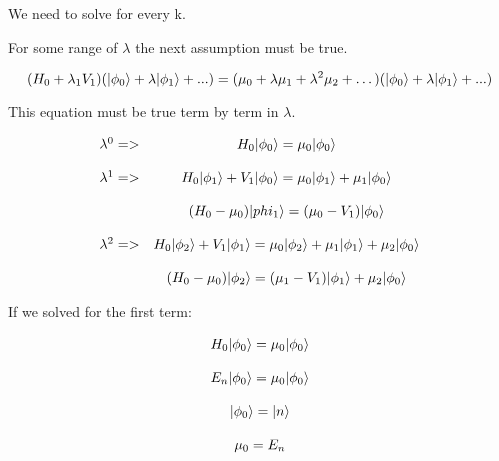 We need to solve for every k.

For some range of $\lambda$ the next assumption must be true.

\begin{equation}
  (H_0 + \lambda_1V_1) (\lvert\phi_0\rangle+\lambda\lvert\phi_1\rangle+...) = (\mu_0 + \lambda\mu_1 + \lambda^2\mu_2 + \dots)(\lvert\phi_0\rangle+\lambda\lvert\phi_1\rangle+...)
\end{equation}

This equation must be true term by term in $\lambda$.

\begin{equation}
  \begin{array}{lc}
    \lambda^0 => & H_0 \lvert\phi_0\rangle = \mu_0 \lvert\phi_0\rangle
    \\

    \\
    \lambda^1 => & H_0 \lvert\phi_1\rangle + V_1 \lvert\phi_0\rangle = \mu_0\lvert\phi_1\rangle + \mu_1\lvert\phi_0\rangle
    \\

    \\
                 & (H_0-\mu_0) \lvert phi_1\rangle = (\mu_0 - V_1) \lvert\phi_0\rangle
    \\

    \\
    \lambda^2 => & H_0 \lvert\phi_2\rangle + V_1 \lvert\phi_1\rangle = \mu_0\lvert\phi_2\rangle + \mu_1\lvert\phi_1\rangle + \mu_2\lvert\phi_0\rangle
    \\

    \\
                 & (H_0-\mu_0) \lvert\phi_2\rangle = (\mu_1 - V_1) \lvert\phi_1\rangle + \mu_2\lvert\phi_0\rangle
  \end{array}
\end{equation}

If we solved for the first term:

\begin{equation}
  \begin{array}{c}
    H_0 \lvert\phi_0\rangle= \mu_0 \lvert\phi_0\rangle
    \\

    \\
    E_n \lvert\phi_0\rangle = \mu_0 \lvert\phi_0\rangle
    \\

    \\
    \lvert\phi_0\rangle = \lvert n\rangle
    \\

    \\
    \mu_0 = E_n
  \end{array}
\end{equation}

